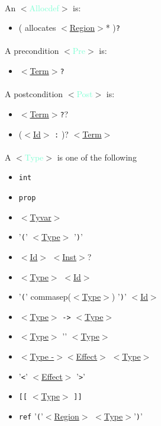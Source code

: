 \documentclass[a4paper]{scrreprt}
\newcommand{\cat}[1]{$<$\hyperref[#1]{#1}$>$}
\newcommand{\catdef}[1]{\label{#1}$<$\textcolor{Aquamarine}{#1}$>$}
\begin{document}
\paragraph{}
An \catdef{Allocdef} is:
\begin{itemize}
  \item ( allocates \cat{Region}* ){\tt ?}
\end{itemize}

\paragraph{}
A precondition \catdef{Pre} is: 
\begin{itemize}
  \item \cat{Term}{\tt ?}
\end{itemize}

\paragraph{}
A postcondition \catdef{Post} is: 
\begin{itemize}
  \item \cat{Term}{\tt ?}? 
  \item (\cat{Id} {\tt :} )? \cat{Term}
\end{itemize}
  

\paragraph{}
A \catdef{Type} is one of the following
\begin{itemize}
  \item {\tt int}
  \item {\tt prop}
  \item \cat{Tyvar}
  \item '{\tt (}' \cat{Type} '{\tt )}'
  \item \cat{Id} \cat{Inst}?
  \item \cat{Type} \cat{Id}
  \item '{\tt (}' commasep(\cat{Type}) '{\tt )}' \cat{Id}
  \item \cat{Type} {\tt ->} \cat{Type}
  \item \cat{Type} '{\tt *}' \cat{Type}
  \item \cat{Type -}\cat{Effect} \cat{Type}
  \item '{\tt <}' \cat{Effect} '{\tt >}'
  \item {\tt [[} \cat{Type} {\tt ]]}
  \item {\tt ref} '{\tt (}'\cat{Region} \cat{Type}'{\tt )}'
\end{itemize}
\end{document}
